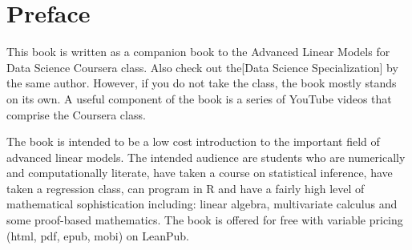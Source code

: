 \chapter{Preface}

This book is written as a companion book to the
Advanced Linear Models for Data Science
Coursera class. Also check out the[Data Science Specialization] by the same author. However, if you do not take the class, the book mostly stands on its own. A
useful component of the book is a series of YouTube videos that comprise the
Coursera class.

The book is intended to be a low cost introduction to the important field of
advanced linear models. The intended audience are students who are numerically
and computationally literate, have taken a
course on statistical inference, have taken a regression class, can program in R
and have a fairly high level of mathematical sophistication including: linear algebra,
multivariate calculus and some proof-based mathematics.
The book is offered for free with variable pricing (html, pdf, epub, mobi) on
LeanPub.


